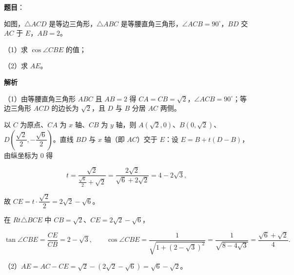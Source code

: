 \begin{answer}

\textbf{题目}：

如图，$\triangle ACD$ 是等边三角形，$\triangle ABC$ 是等腰直角三角形，$\angle ACB=90^\circ$，$BD$ 交 $AC$ 于 $E$，$AB=2$。

（1）求 $\cos\angle CBE$ 的值；

（2）求 $AE$。
\nopagebreak[4]
\begin{center}\end{center}
\nopagebreak[4]
\textbf{解析}

（1）由等腰直角三角形 $ABC$ 且 $AB=2$ 得 $CA=CB=\sqrt2$，$\angle ACB=90^\circ$；等边三角形 $ACD$ 的边长为 $\sqrt2$，且 $D$ 与 $B$ 分居 $AC$ 两侧。

以 $C$ 为原点、$CA$ 为 $x$ 轴、$CB$ 为 $y$ 轴，则 $A(\sqrt2,0)$、$B(0,\sqrt2)$、$D\left(\dfrac{\sqrt2}2,-\dfrac{\sqrt6}2\right)$。直线 $BD$ 与 $x$ 轴（即 $AC$）交于 $E$：设 $E=B+t(D-B)$，由纵坐标为 $0$ 得

\nopagebreak[4]
\[t=\frac{\sqrt2}{\frac{\sqrt6}2+\sqrt2}=\frac{2\sqrt2}{\sqrt6+2\sqrt2}=4-2\sqrt3,\]

故 $CE=t\cdot\dfrac{\sqrt2}2=2\sqrt2-\sqrt6$。

在 $Rt\triangle BCE$ 中 $CB=\sqrt2$、$CE=2\sqrt2-\sqrt6$，

\nopagebreak[4]
\[\tan\angle CBE=\frac{CE}{CB}=2-\sqrt3,\qquad
\cos\angle CBE=\frac1{\sqrt{1+(2-\sqrt3)^2}}=\frac1{\sqrt{8-4\sqrt3}}=\frac{\sqrt6+\sqrt2}4.\]

（2）$AE=AC-CE=\sqrt2-(2\sqrt2-\sqrt6)=\sqrt6-\sqrt2$。


\end{answer}
